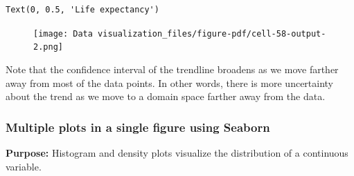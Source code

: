\documentclass[
  letterpaper,
  DIV=11,
  numbers=noendperiod]{scrreprt}
\newenvironment{Shaded}{\begin{snugshade}}{\end{snugshade}}
\newcommand{\BuiltInTok}[1]{\textcolor[rgb]{0.00,0.23,0.31}{#1}}
\newcommand{\CommentTok}[1]{\textcolor[rgb]{0.37,0.37,0.37}{#1}}
\newcommand{\DecValTok}[1]{\textcolor[rgb]{0.68,0.00,0.00}{#1}}
\newcommand{\FloatTok}[1]{\textcolor[rgb]{0.68,0.00,0.00}{#1}}
\newcommand{\NormalTok}[1]{\textcolor[rgb]{0.00,0.23,0.31}{#1}}
\newcommand{\OperatorTok}[1]{\textcolor[rgb]{0.37,0.37,0.37}{#1}}
\newcommand{\StringTok}[1]{\textcolor[rgb]{0.13,0.47,0.30}{#1}}
\begin{document}
\begin{Shaded}
\end{Shaded}

\begin{verbatim}
Text(0, 0.5, 'Life expectancy')
\end{verbatim}

\begin{figure}[H]

{\centering \texttt{[image: Data visualization\_files/figure-pdf/cell-58-output-2.png]}

}

\end{figure}

Note that the confidence interval of the trendline broadens as we move
farther away from most of the data points. In other words, there is more
uncertainty about the trend as we move to a domain space farther away
from the data.

\hypertarget{multiple-plots-in-a-single-figure-using-seaborn}{%
\subsubsection{Multiple plots in a single figure using
Seaborn}\label{multiple-plots-in-a-single-figure-using-seaborn}}

\textbf{Purpose:} Histogram and density plots visualize the distribution
of a continuous variable.
\end{document}
